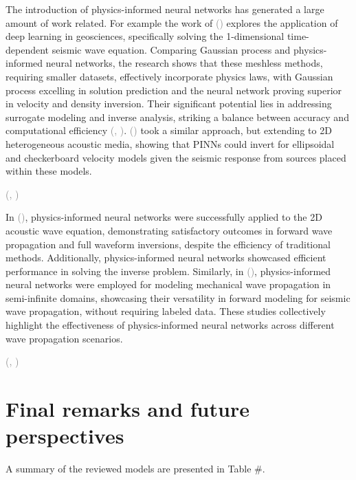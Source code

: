 \documentclass{tufte-handout}
\renewcommand{\citep}[2][]{\textcolor{gray}{(\citeauthor{#2}, \citeyear[#1]{#2})}}
\renewcommand{\citeauthoryear}[2][]{\textcolor{gray}{\citeauthor{#2} (\textcolor{gray}{\citeyear[#1]{#2}})}}
\begin{document}
The introduction of physics-informed neural networks has generated a large amount of work related. For example the work of \citeauthoryear{karimpouli_physics_2020} explores the application of deep learning in geosciences, specifically solving the 1-dimensional time-dependent seismic wave equation. Comparing Gaussian process and physics-informed neural networks, the research shows that these meshless methods, requiring smaller datasets, effectively incorporate physics laws, with Gaussian process excelling in solution prediction and the neural network proving superior in velocity and density inversion. Their significant potential lies in addressing surrogate modeling and inverse analysis, striking a balance between accuracy and computational efficiency \citep{Song2022}. \citeauthoryear{rash_2022} took a similar approach, but extending to 2D heterogeneous acoustic media, showing that PINNs could invert for ellipsoidal and checkerboard velocity models given the seismic response from sources placed within these models.

\citep{alkhadhr_modeling_2021}


In \citeauthoryear{moseley_physics-informed_2022}, physics-informed neural networks were successfully applied to the 2D acoustic wave equation, demonstrating satisfactory outcomes in forward wave propagation and full waveform inversions, despite the efficiency of traditional methods. Additionally, physics-informed neural networks showcased efficient performance in solving the inverse problem. Similarly, in \citeauthoryear{ren_seismicnet_2024}, physics-informed neural networks were employed for modeling mechanical wave propagation in semi-infinite domains, showcasing their versatility in forward modeling for seismic wave propagation, without requiring labeled data. These studies collectively highlight the effectiveness of physics-informed neural networks across different wave propagation scenarios.

\citep{wu_helmholtz-equation_2023}



\section{Final remarks and future perspectives}\label{sec:final_remarks_and_perspectives}


A summary of the reviewed models are presented in Table \#.
\end{document}

